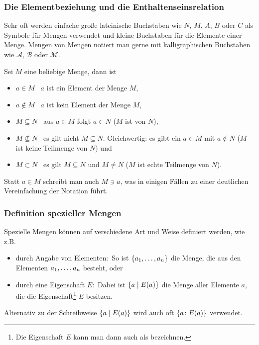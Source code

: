 \subsubsection{Die Elementbeziehung und die Enthaltenseinsrelation}
Sehr oft werden einfache große lateinische Buchstaben wie $N$, $M$, $A$, $B$ oder $C$ 
als Symbole für Mengen verwendet und kleine Buchstaben für die Elemente einer Menge.
Mengen von Mengen notiert man gerne mit kalligraphischen Buchstaben wie $\mathcal{A}$, 
$\mathcal{B}$ oder $\mathcal{M}$.
\begin{definition}
\label{InclSet}
Sei $M$ eine beliebige Menge, dann ist
\begin{itemize}
%
\item $a \in M$ \gdw\ $a$ ist ein Element der Menge
$M$\index{$\in$},
%
\item $a \not\in M$ \gdw\ $a$ ist kein Element der Menge $M$\index{$\not\in$},
%
\item $M \subseteq N$ \gdw\ aus $a \in M$ folgt $a \in N$ ($M$ ist
 von $N$)\index{$\subseteq$},
%
\item $M \not\subseteq N$ \gdw\ es gilt nicht $M \subseteq
N$. Gleichwertig: es gibt ein $a \in M$ mit $a \not\in N$ ($M$ ist
keine Teilmenge von $N$)\index{$\not\subseteq$} und
%
\item $M \subset N$ \gdw\ es gilt $M \subseteq N$ und $M \not= N$ ($M$ ist
echte Teilmenge von $N$)\index{$\subset$}.
%
\end{itemize}
Statt $a \in M$ schreibt man auch $M \ni a$\index{$\ni$}, was in
einigen Fällen zu einer deutlichen Vereinfachung der Notation führt.
\end{definition}

\subsubsection{Definition spezieller Mengen}
\label{MengenDef}
Spezielle Mengen können auf verschiedene Art und Weise definiert
werden, wie z.B.
\begin{itemize}
%
\item durch Angabe von Elementen:\ So ist $\{{a_{1}}, \allowbreak \dots , \allowbreak{a_{n}}\}$ die Menge,
die aus den Elementen ${a_{1}}, \allowbreak \dots , \allowbreak{a_{n}}$ besteht, oder
%
\item durch eine Eigenschaft $E$:\ Dabei ist $\{a \mid E(a)\}$ die Menge
aller Elemente $a$, die die Eigenschaft\footnote{Die Eigenschaft $E$
kann man dann auch als  bezeichnen.} $E$ besitzen.
%
\end{itemize}
Alternativ zu der Schreibweise $\{a \mid E(a)\}$ wird auch oft 
$\{a \colon E(a)\}$ verwendet.


